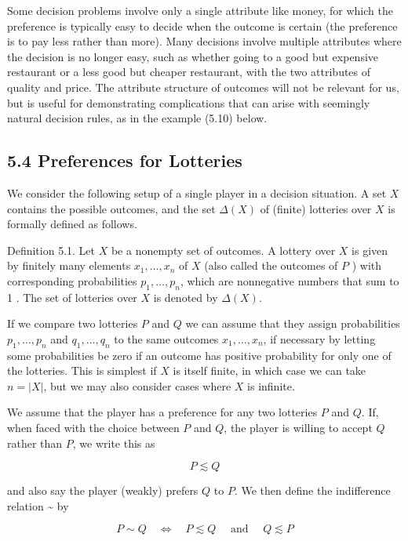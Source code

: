 \documentclass[12pt]{article}
\begin{document}
Some decision problems involve only a single attribute like money, for which the preference is typically easy to decide when the outcome is certain (the preference is to pay less rather than more). Many decisions involve multiple attributes where the decision is no longer easy, such as whether going to a good but expensive restaurant or a less good but cheaper restaurant, with the two attributes of quality and price. The attribute structure of outcomes will not be relevant for us, but is useful for demonstrating complications that can arise with seemingly natural decision rules, as in the example (5.10) below.

\subsection*{5.4 Preferences for Lotteries}
We consider the following setup of a single player in a decision situation. A set $X$ contains the possible outcomes, and the set $\Delta(X)$ of (finite) lotteries over $X$ is formally defined as follows.

Definition 5.1. Let $X$ be a nonempty set of outcomes. A lottery over $X$ is given by finitely many elements $x_{1}, \ldots, x_{n}$ of $X$ (also called the outcomes of $P$ ) with corresponding probabilities $p_{1}, \ldots, p_{n}$, which are nonnegative numbers that sum to 1 . The set of lotteries over $X$ is denoted by $\Delta(X)$.

If we compare two lotteries $P$ and $Q$ we can assume that they assign probabilities $p_{1}, \ldots, p_{n}$ and $q_{1}, \ldots, q_{n}$ to the same outcomes $x_{1}, \ldots, x_{n}$, if necessary by letting some probabilities be zero if an outcome has positive probability for only one of the lotteries. This is simplest if $X$ is itself finite, in which case we can take $n=|X|$, but we may also consider cases where $X$ is infinite.

We assume that the player has a preference for any two lotteries $P$ and $Q$. If, when faced with the choice between $P$ and $Q$, the player is willing to accept $Q$ rather than $P$, we write this as

$$
P \lesssim Q
$$

and also say the player (weakly) prefers $Q$ to $P$. We then define the indifference relation \~{} by


\begin{equation*}
P \sim Q \quad \Leftrightarrow \quad P \lesssim Q \quad \text { and } \quad Q \lesssim P \tag{5.4}
\end{equation*}
\end{document}
